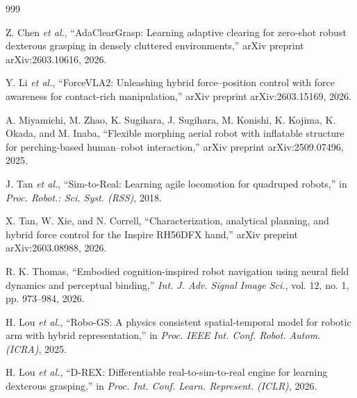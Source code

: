 \documentclass[12pt,a4paper,oneside]{report}
\begin{document}
\begin{thebibliography}{999}

Z. Chen \textit{et al.}, ``{AdaClearGrasp}: Learning adaptive clearing for zero-shot robust dexterous grasping in densely cluttered environments,'' arXiv preprint arXiv:2603.10616, 2026.




Y. Li \textit{et al.}, ``{ForceVLA}2: Unleashing hybrid force--position control with force awareness for contact-rich manipulation,'' arXiv preprint arXiv:2603.15169, 2026.




A. Miyamichi, M. Zhao, K. Sugihara, J. Sugihara, M. Konishi, K. Kojima, K. Okada, and M. Inaba, ``Flexible morphing aerial robot with inflatable structure for perching-based human--robot interaction,'' arXiv preprint arXiv:2509.07496, 2025.




J. Tan \textit{et al.}, ``{Sim-to-Real}: Learning agile locomotion for quadruped robots,'' in \textit{Proc. Robot.: Sci. Syst. (RSS)}, 2018.




X. Tan, W. Xie, and N. Correll, ``Characterization, analytical planning, and hybrid force control for the Inspire {RH}56{DFX} hand,'' arXiv preprint arXiv:2603.08988, 2026.




R. K. Thomas, ``Embodied cognition-inspired robot navigation using neural field dynamics and perceptual binding,'' \textit{Int. J. Adv. Signal Image Sci.}, vol. 12, no. 1, pp. 973--984, 2026.




H. Lou \textit{et al.}, ``{Robo-GS}: A physics consistent spatial-temporal model for robotic arm with hybrid representation,'' in \textit{Proc. IEEE Int. Conf. Robot. Autom. (ICRA)}, 2025.




H. Lou \textit{et al.}, ``D-REX: Differentiable real-to-sim-to-real engine for learning dexterous grasping,'' in \textit{Proc. Int. Conf. Learn. Represent. (ICLR)}, 2026.




\end{thebibliography}
\end{document}
